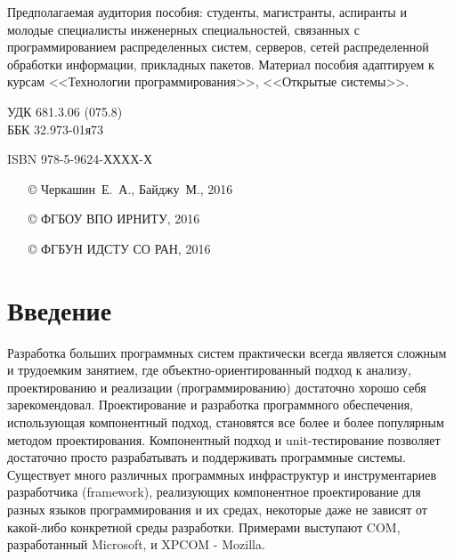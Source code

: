 \documentclass[a4paper,openany,twoside,final]{book}
\newcommand\e[1]{#1}
\begin{document}
\begin{mygroup}
\begin{minipage}[t]{0.95\linewidth}
Предполагаемая аудитория пособия: студенты, магистранты, аспиранты и молодые специалисты инженерных специальностей, связанных с программированием распределенных систем, серверов, сетей распределенной обработки информации, прикладных пакетов. Материал пособия адаптируем к курсам <<Технологии программирования>>, <<Открытые системы>>.

\mbox{}
\endgroup
\end{minipage}
\mbox{}\hspace{0.7\linewidth}
\begin{minipage}{0.3\linewidth}\small
\noindent УДК 681.3.06 (075.8)\\
\noindent ББК 32.973-01я73
\end{minipage}
\vfill
\vfill
\noindent\begin{minipage}[t]{0.35\linewidth}\small
\noindent \e{ISBN 978-5-9624-ХХХХ-Х}
\end{minipage}%
\begin{minipage}[t]{0.65\linewidth}\small
\begin{itemize}
\setlength{\itemsep}{-0.5ex}
\setlength{\parsep}{0pt}
\item[\copyright{}] Черкашин~Е.~А., Байджу~М., 2016
\item[\copyright{}] ФГБОУ ВПО ИРНИТУ, 2016
\item[\copyright{}] ФГБУН ИДСТУ СО РАН, 2016
\end{itemize}
\end{minipage}
\end{mygroup}
\newpage{}
\label{contents}
\tableofcontents



\chapter{Введение%
  \label{id1}%
}



Разработка больших программных систем практически всегда является
сложным и трудоемким занятием, где объектно-ориентированный подход к
анализу, проектированию и реализации (программированию) достаточно
хорошо себя зарекомендовал.  Проектирование и разработка программного
обеспечения, использующая компонентный подход, становятся все более и
более популярным методом проектирования.  Компонентный подход и
unit-тестирование позволяет достаточно просто разрабатывать и
поддерживать программные системы.  Существует много различных
программных инфраструктур и инструментариев разработчика (framework),
реализующих компонентное проектирование для разных языков
программирования и их средах, некоторые даже не зависят от какой-либо
конкретной среды разработки.  Примерами выступают COM, разработанный
Microsoft, и XPCOM - Mozilla.
\end{document}
